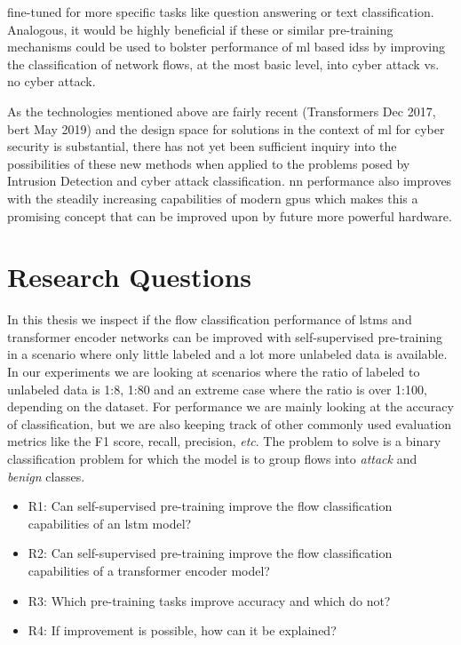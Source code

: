 fine-tuned for more specific tasks like question answering or text classification. Analogous, it would be highly beneficial if these or similar pre-training mechanisms could be used to bolster performance of \gls{ml} based \glspl{ids} by improving the classification of network flows, at the most basic level, into cyber attack vs. no cyber attack. \par
As the technologies mentioned above are fairly recent (Transformers Dec 2017, \gls{bert} May 2019) and the design space for solutions in the context of \gls{ml} for cyber security is substantial, there has not yet been sufficient inquiry into the possibilities of these new methods when applied to the problems posed by Intrusion Detection and cyber attack classification. \gls{nn} performance also improves with the steadily increasing capabilities of modern \glspl{gpu} which makes this a promising concept that can be improved upon by future more powerful hardware. 


\section{Research Questions} \label{sect.research_questions}

In this thesis we inspect if the flow classification performance of \glspl{lstm} and transformer encoder networks can be improved with self-supervised pre-training in a scenario where only little labeled and a lot more unlabeled data is available. In our experiments we are looking at scenarios where the ratio of labeled to unlabeled data is 1:8, 1:80 and an extreme case where the ratio is over 1:100, depending on the dataset. For performance we are mainly looking at the accuracy of classification, but we are also keeping track of other commonly used evaluation metrics like the F1 score, recall, precision, \textit{etc}. The problem to solve is a binary classification problem for which the model is to group flows into \textit{attack} and \textit{benign} classes. 

\begin{itemize}
	\item R1: Can self-supervised pre-training improve the flow classification capabilities of an \gls{lstm} model?
	\item R2: Can self-supervised pre-training improve the flow classification capabilities of a transformer encoder model?
	\item R3: Which pre-training tasks improve accuracy and which do not?
	\item R4: If improvement is possible, how can it be explained?
\end{itemize}


